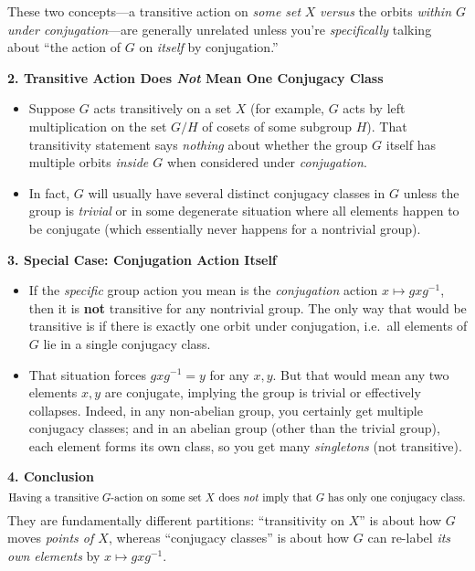 \documentclass[12pt]{article}
\theoremstyle{definition} %
\theoremstyle{plain} %
\begin{document}
These two concepts---a transitive action on \emph{some set} $X$ \emph{versus} the orbits \emph{within $G$ under conjugation}---are generally unrelated unless you're \emph{specifically} talking about “the action of $G$ on \emph{itself} by conjugation.”

\bigskip

\noindent
\textbf{2. Transitive Action Does \emph{Not} Mean One Conjugacy Class}

\begin{itemize}
    \item Suppose $G$ acts transitively on a set $X$ (for example, $G$ acts by left multiplication on the set $G/H$ of cosets of some subgroup $H$).  That transitivity statement says \emph{nothing} about whether the group $G$ itself has multiple orbits \emph{inside $G$} when considered under \emph{conjugation}. 
    \item In fact, $G$ will usually have several distinct conjugacy classes in $G$ unless the group is \emph{trivial} or in some degenerate situation where all elements happen to be conjugate (which essentially never happens for a nontrivial group).
\end{itemize}

\bigskip

\noindent
\textbf{3. Special Case: Conjugation Action Itself} 
\begin{itemize}
    \item If the \emph{specific} group action you mean is the \emph{conjugation} action $x \mapsto gxg^{-1}$, then it is \textbf{not} transitive for any nontrivial group.  The only way that would be transitive is if there is exactly one orbit under conjugation, i.e.\ all elements of $G$ lie in a single conjugacy class. 
    \item That situation forces $gxg^{-1} = y$ for any $x,y$.  But that would mean any two elements $x,y$ are conjugate, implying the group is trivial or effectively collapses.  Indeed, in any non-abelian group, you certainly get multiple conjugacy classes; and in an abelian group (other than the trivial group), each element forms its own class, so you get many \emph{singletons} (not transitive).
\end{itemize}

\bigskip

\noindent
\textbf{4. Conclusion}
\[
\text{Having a transitive $G$-action on some set $X$ does \emph{not} imply that $G$ has only one conjugacy class.}
\]
They are fundamentally different partitions: “transitivity on $X$” is about how $G$ moves \emph{points of $X$}, whereas “conjugacy classes” is about how $G$ can re-label \emph{its own elements} by $x \mapsto gxg^{-1}.$
\end{document}
